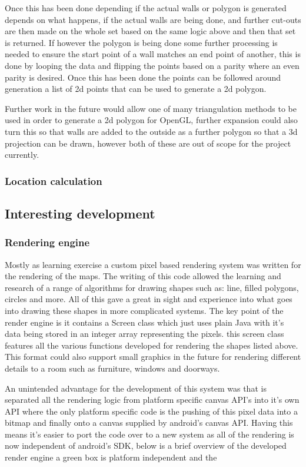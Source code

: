 Once this has been done depending if the actual walls or polygon is generated depends on what happens, if the actual walls are being done, and further cut-outs are then made on the whole set based on the same logic above and then that set is returned. If however the polygon is being done some further processing is needed to ensure the start point of a wall matches an end point of another, this is done by looping the data and flipping the points based on a parity where an even parity is desired. Once this has been done the points can be followed around generation a list of 2d points that can be used to generate a 2d polygon.

Further work in the future would allow one of many triangulation methods to be used in order to generate a 2d polygon for OpenGL, further expansion could also turn this so that walls are added to the outside as a further polygon so that a 3d projection can be drawn, however both of these are out of scope for the project currently.


\subsubsection{Location calculation}

\subsection{Interesting development}
\subsubsection{Rendering engine}
Mostly as learning exercise a custom pixel based rendering system was written for the rendering of the maps. The writing of this code allowed the learning and research of a range of algorithms for drawing shapes such as: line, filled polygons, circles and more. All of this gave a great in sight and experience into what goes into drawing these shapes in more complicated systems. The key point of the render engine is it contains a Screen class which just uses plain Java with it's data being stored in an integer array representing the pixels. this screen class features all the various functions developed for rendering the shapes listed above. This format could also support small graphics in the future for rendering different details to a room such as furniture, windows and doorways.

An unintended advantage for the development of this system was that is separated all the rendering logic from platform specific canvas API's into it's own API where the only platform specific code is the pushing of this pixel data into a bitmap and finally onto a canvas supplied by android's canvas API. Having this means it's easier to port the code over to a new system as all of the rendering is now independent of android's SDK, below is a brief overview of the developed render engine a green box is platform independent and the 

